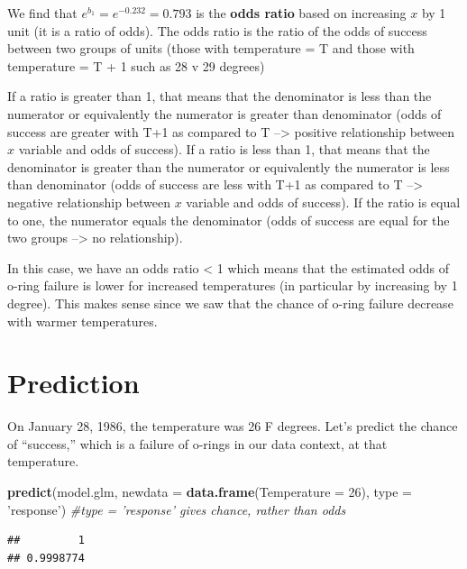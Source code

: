 \documentclass[]{book}
\newenvironment{Shaded}{\begin{snugshade}}{\end{snugshade}}
\newcommand{\CommentTok}[1]{\textcolor[rgb]{0.56,0.35,0.01}{\textit{#1}}}
\newcommand{\DataTypeTok}[1]{\textcolor[rgb]{0.13,0.29,0.53}{#1}}
\newcommand{\DecValTok}[1]{\textcolor[rgb]{0.00,0.00,0.81}{#1}}
\newcommand{\KeywordTok}[1]{\textcolor[rgb]{0.13,0.29,0.53}{\textbf{#1}}}
\newcommand{\NormalTok}[1]{#1}
\newcommand{\StringTok}[1]{\textcolor[rgb]{0.31,0.60,0.02}{#1}}
\begin{document}
We find that \(e^{b_1} = e^{-0.232} = 0.793\) is the \textbf{odds ratio} based on increasing \(x\) by 1 unit (it is a ratio of odds). The odds ratio is the ratio of the odds of success between two groups of units (those with temperature = T and those with temperature = T + 1 such as 28 v 29 degrees)

If a ratio is greater than 1, that means that the denominator is less than the numerator or equivalently the numerator is greater than denominator (odds of success are greater with T+1 as compared to T --\textgreater{} positive relationship between \(x\) variable and odds of success). If a ratio is less than 1, that means that the denominator is greater than the numerator or equivalently the numerator is less than denominator (odds of success are less with T+1 as compared to T --\textgreater{} negative relationship between \(x\) variable and odds of success). If the ratio is equal to one, the numerator equals the denominator (odds of success are equal for the two groups --\textgreater{} no relationship).

In this case, we have an odds ratio \textless{} 1 which means that the estimated odds of o-ring failure is lower for increased temperatures (in particular by increasing by 1 degree). This makes sense since we saw that the chance of o-ring failure decrease with warmer temperatures.

\hypertarget{prediction-1}{%
\section{Prediction}\label{prediction-1}}

On January 28, 1986, the temperature was 26 F degrees. Let's predict the chance of ``success,'' which is a failure of o-rings in our data context, at that temperature.

\begin{Shaded}
\begin{Highlighting}[]
\KeywordTok{predict}\NormalTok{(model.glm, }\DataTypeTok{newdata =} \KeywordTok{data.frame}\NormalTok{(}\DataTypeTok{Temperature =} \DecValTok{26}\NormalTok{), }\DataTypeTok{type =} \StringTok{'response'}\NormalTok{) }\CommentTok{#type = 'response' gives chance, rather than odds}
\end{Highlighting}
\end{Shaded}

\begin{verbatim}
##         1 
## 0.9998774
\end{verbatim}
\end{document}
